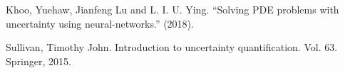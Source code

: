 \begin{thebibliography}{99} %
\begin{LTR}
Khoo, Yuehaw, Jianfeng Lu and L. I. U. Ying. “Solving PDE problems with uncertainty using neural-networks.” (2018).

Sullivan, Timothy John. Introduction to uncertainty quantification. Vol. 63. Springer, 2015.
\end{LTR}




\end{thebibliography}